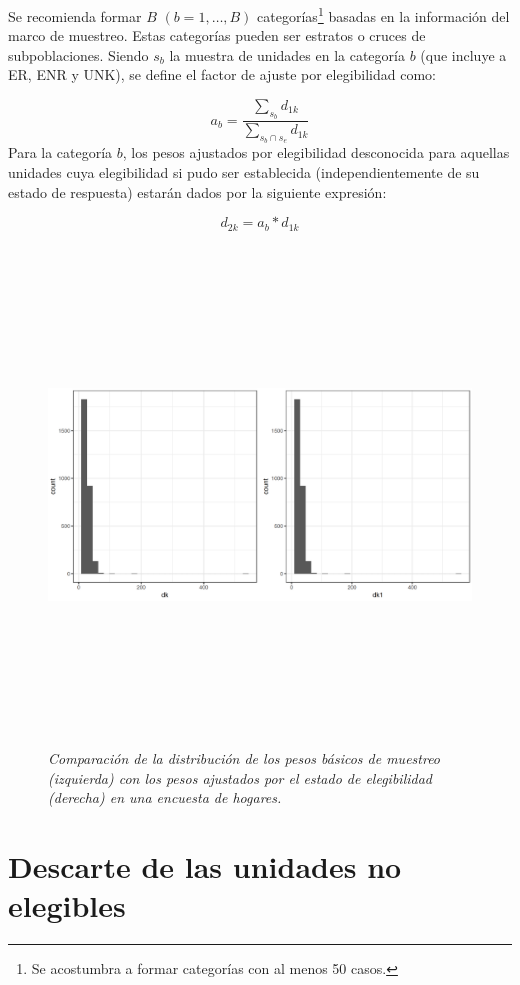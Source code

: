 \documentclass[
  10pt,
  spanish,
]{book}
\begin{document}
Se recomienda formar \(B\) \((b = 1, \ldots, B)\) categorías\footnote{Se acostumbra a formar categorías con al menos 50 casos.} basadas en la información del marco de muestreo. Estas categorías pueden ser estratos o cruces de subpoblaciones. Siendo \(s_b\) la muestra de unidades en la categoría \(b\) (que incluye a ER, ENR y UNK), se define el factor de ajuste por elegibilidad como:

\[
a_b = \frac{\sum_{s_b}d_{1k}}{\sum_{s_b \cap s_e}d_{1k}}
\]
Para la categoría \(b\), los pesos ajustados por elegibilidad desconocida para aquellas unidades cuya elegibilidad si pudo ser establecida (independientemente de su estado de respuesta) estarán dados por la siguiente expresión:

\[
d_{2k} = a_b * d_{1k}
\]

\begin{figure}
\centering
\includegraphics[width=\textwidth,height=5.20833in]{Pics/16.png}
\caption{\emph{Comparación de la distribución de los pesos básicos de muestreo (izquierda) con los pesos ajustados por el estado de elegibilidad (derecha) en una encuesta de hogares.}}
\end{figure}

\hypertarget{descarte-de-las-unidades-no-elegibles}{%
\section{Descarte de las unidades no elegibles}\label{descarte-de-las-unidades-no-elegibles}}
\end{document}
